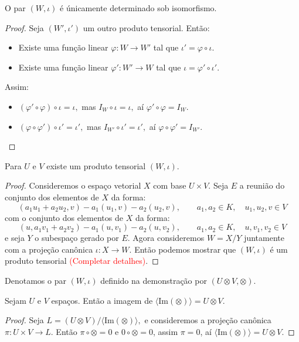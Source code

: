 \documentclass[11pt,twoside,a4paper]{book}
\begin{document}
\begin{proposicao}
O par $(W,\iota)$ é únicamente determinado sob isomorfismo.
\end{proposicao}
\begin{proof}
Seja $(W',\iota')$ um outro produto tensorial. Então:
\begin{itemize}
\item Existe uma função linear $\varphi:W\rightarrow W'$ tal que $\iota'=\varphi\circ\iota.$
\item Existe uma função linear $\varphi':W'\rightarrow W$ tal que $\iota=\varphi'\circ\iota'.$
\end{itemize}
Assim:
\begin{itemize}
\item $(\varphi'\circ\varphi)\circ\iota=\iota,$ mas $I_W\circ\iota=\iota,$ aí $\varphi'\circ\varphi=I_W.$
\item $(\varphi\circ\varphi')\circ\iota'=\iota',$ mas $I_{W'}\circ\iota'=\iota',$ aí $\varphi\circ\varphi'=I_{W'}.$
\end{itemize}
\end{proof}

\begin{proposicao}
Para $U$ e $V$ existe um produto tensorial $(W,\iota).$
\end{proposicao}
\begin{proof}
Consideremos o espaço vetorial $X$ com base $U\times V.$ Seja $E$ a reunião do conjunto dos elementos de $X$ da forma:
\[
(a_1u_1+a_2u_2,v)-a_1(u_1,v)-a_2(u_2,v),\quad\quad a_1,a_2\in K,\quad u_1,u_2,v\in V
\]
com o conjunto dos elementos de $X$ da forma:
\[
(u,a_1v_1+a_2v_2)-a_1(u,v_1)-a_2(u,v_2),\quad\quad a_1,a_2\in K,\quad u,v_1,v_2\in V
\]
e seja $Y$ o subespaço gerado por $E$. Agora consideremos $W=X/Y$ juntamente com a projeção canônica $\iota:X\rightarrow W.$ Então podemos mostrar que $(W,\iota)$ é um produto tensorial \textcolor{red}{(Completar detalhes)}.
\end{proof}

\begin{definicao}
Denotamos o par $(W,\iota)$ definido na demonstração por $(U\otimes V,\otimes).$
\end{definicao}

\begin{proposicao}
Sejam $U$ e $V$ espaços. Então a imagem de $\langle\mathrm{Im}(\otimes)\rangle=U\otimes V$.
\end{proposicao}
\begin{proof}
Seja $L=(U\otimes V)/\langle\mathrm{Im}(\otimes)\rangle,$ e consideremos a projeção canônica $\pi:U\times V\rightarrow L.$ Então $\pi\circ\otimes=0$ e $0\circ\otimes=0$, assim $\pi=0$, aí $\langle\mathrm{Im}(\otimes)\rangle=U\otimes V.$
\end{proof}
\end{document}
